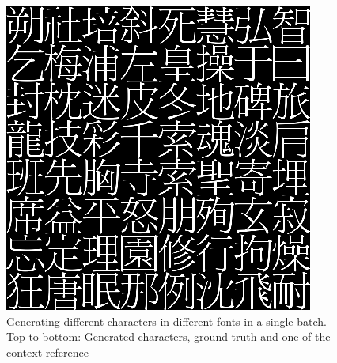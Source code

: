 \documentclass[10pt,twocolumn,letterpaper]{article}
\begin{document}
\begin{figure}[t]
\begin{center}
		\includegraphics[width=0.8\linewidth]{385r1.png}
	\end{center}
	\caption{Generating different characters in different fonts in a single batch. Top to bottom: Generated characters, ground truth and one of the context reference}
	\label{fig:long}
	\label{fig:onecol}
\end{figure}
\end{document}
